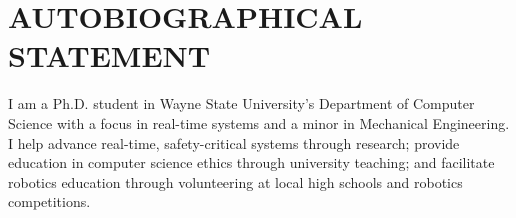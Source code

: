 \section*{AUTOBIOGRAPHICAL STATEMENT}
I am a Ph.D. student in Wayne State University's Department of Computer Science with a focus in real-time systems and a minor in Mechanical Engineering. I help advance real-time, safety-critical systems through research; provide education in computer science ethics through university teaching; and facilitate robotics education through volunteering at local high schools and robotics competitions.